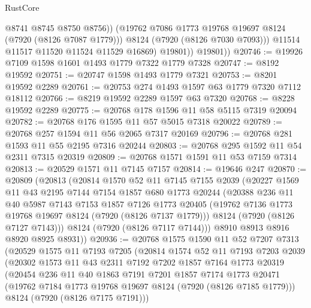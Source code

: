 \begin{lexlean}{RustCore}
\begin{coremodule}
                    @8741
                    @8745
                    @8750
                    @8756))
                (@19762 @7086 @1773 @19768 @19697 @8124 (@7920 (@8126 @7087 @1779)))
                @8124
                (@7920 (@8126 @7030 @7093)))
              @11514
              @11517
              @11520
              @11524
              @11529
              @16869)
            @19801))
        @19801))
@20746 := @19926 @7109 @1598 @1601 @1493 @1779 @7322 @1779 @7328
@20747 := @8192 @19592
@20751 := @20747 @1598 @1493 @1779 @7321
@20753 := @8201 @19592 @2289
@20761 := @20753 @274 @1493 @1597 @63 @1779 @7320 @7112 @18112
@20766 := @8219 @19592 @2289 @1597 @63 @7320
@20768 := @8228 @19592 @2289
@20775 := @20768 @178 @1596 @11 @58 @5115 @7319 @20094
@20782 := @20768 @176 @1595 @11 @57 @5015 @7318 @20022
@20789 := @20768 @257 @1594 @11 @56 @2065 @7317 @20169
@20796 := @20768 @281 @1593 @11 @55 @2195 @7316 @20244
@20803 := @20768 @295 @1592 @11 @54 @2311 @7315 @20319
@20809 := @20768 @1571 @1591 @11 @53 @7159 @7314
@20813 := @20529 @1571 @11 @7145 @7157
@20814 := @19646 @247
@20870 := @20809
    (@20813
      (@20814
        @1570
        @52
        @11
        @7145
        @7155
        @2039
        (@20227
          @1569
          @11
          @43
          @2195
          @7144
          @7154
          @1857
          @680
          @1773
          @20244
          (@20388
            @236
            @11
            @40
            @5987
            @7143
            @7153
            @1857
            @7126
            @1773
            @20405
            (@19762 @7136 @1773 @19768 @19697 @8124 (@7920 (@8126 @7137 @1779)))
            @8124
            (@7920 (@8126 @7127 @7143)))
          @8124
          (@7920 (@8126 @7117 @7144)))
        @8910
        @8913
        @8916
        @8920
        @8925
        @8931))
@20936 := @20768
    @1575
    @1590
    @11
    @52
    @7207
    @7313
    (@20529
      @1575
      @11
      @7193
      @7205
      (@20814
        @1574
        @52
        @11
        @7193
        @7203
        @2039
        (@20302
          @1573
          @11
          @43
          @2311
          @7192
          @7202
          @1857
          @7164
          @1773
          @20319
          (@20454
            @236
            @11
            @40
            @1863
            @7191
            @7201
            @1857
            @7174
            @1773
            @20471
            (@19762 @7184 @1773 @19768 @19697 @8124 (@7920 (@8126 @7185 @1779)))
            @8124
            (@7920 (@8126 @7175 @7191)))

\end{coremodule}
\end{lexlean}
